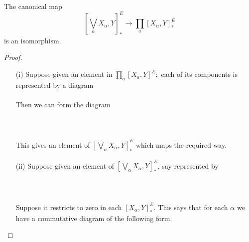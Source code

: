 \documentclass[../main]{subfiles}
\begin{document}
\begin{lemma} \label{lem:p3ch14.10}
The canonical map 
$$
  \left[\bigvee_{\alpha}X_{\alpha},Y\right]^E_{\ast} \to \prod_{a} \left[X_{\alpha},Y\right]^E_{\ast}
$$ 
is an isomorphism.
\begin{proof}
  \begin{enumerate} 
    \item [(i)] Suppose given an element in $\prod_{a}\left[X_{a},Y\right]^E;$ each of its components is represented by a diagram\\~\\
      Then we can form the diagram 
      ~\\~\\
      ~\\~\\
      This gives an element of $ \left[\bigvee_{\alpha} X_{\alpha} , Y \right]^E_{\ast}$ which maps the required way.
      \item [(ii)] Suppose given an element of $\left[\bigvee_{\alpha} X_{\alpha}, Y \right]^E_{\ast}$, say represented by 
        ~\\~\\
        ~\\~\\
       Suppose it restricts to zero in each  $ \left[X_{\alpha},Y\right]^E_{\ast}$. This says that for each $\alpha$ we have a commutative diagram of the following form;

\end{enumerate}
\end{proof}
\end{lemma}
\end{document}
